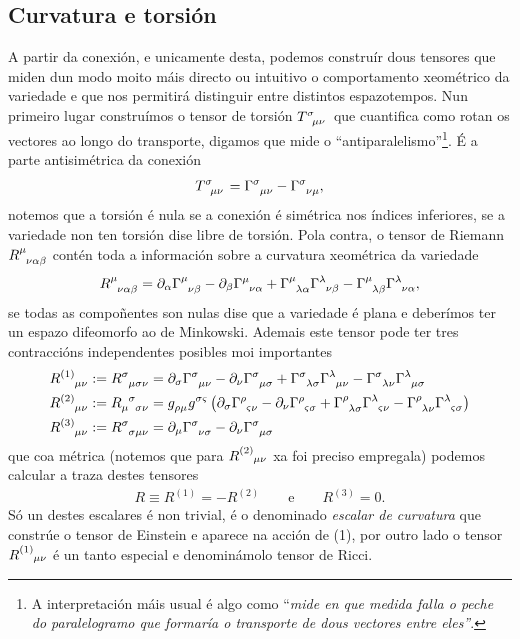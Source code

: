 \subsection{Curvatura e torsión}
A partir da conexión, e unicamente desta, podemos construír dous tensores que miden dun modo moito máis directo ou intuitivo o comportamento xeométrico da variedade e que nos permitirá distinguir entre distintos espazotempos. Nun primeiro lugar construímos o tensor de torsión $T\indices{^\sigma_\mu_\nu}$ que cuantifica como rotan os vectores ao longo do transporte, digamos que mide o ``antiparalelismo''\footnote{A interpretación máis usual é algo como ``\textit{mide en que medida falla o peche do paralelogramo que formaría o transporte de dous vectores entre eles''}.}. É a parte antisimétrica da conexión
\begin{align}
    T\indices{^\sigma_\mu_\nu} = \Gamma\indices{^\sigma_\mu_\nu} - \Gamma\indices{^\sigma_\nu_\mu},
\end{align}
notemos que a torsión é nula se a conexión é simétrica nos índices inferiores, se a variedade non ten torsión dise libre de torsión.
Pola contra, o tensor de Riemann $R\indices{^\mu_\nu_\alpha_\beta}$ contén toda a información sobre a curvatura xeométrica da variedade
\begin{align}
    R\indices{^\mu_\nu_\alpha_\beta} = \riemann ,
\end{align}
se todas as compoñentes son nulas dise que a variedade é plana e deberímos ter un espazo difeomorfo ao de Minkowski. Ademais este tensor pode ter tres contraccións independentes posibles moi importantes
\begin{align}
    R\indices{^{(1)}_\mu_\nu}&:= R\indices{^\sigma_\mu_\sigma_\nu} = \partial_\sigma \Gamma\indices{^\sigma_\mu_\nu} - \partial_\nu \Gamma\indices{^\sigma_\mu_\sigma} + \Gamma\indices{^\sigma_\lambda_\sigma}\Gamma\indices{^\lambda_\mu_\nu} - \Gamma\indices{^\sigma_\lambda_\nu}\Gamma\indices{^\lambda_\mu_\sigma}\\
    R\indices{^{(2)}_\mu_\nu}&:= R\indices{_\mu^\sigma_\sigma_\nu} = g\indices{_\rho_\mu}g\indices{^\sigma^\varsigma}\left( \partial_\sigma \Gamma\indices{^\rho_\varsigma_\nu} - \partial_\nu \Gamma\indices{^\rho_\varsigma_\sigma} + \Gamma\indices{^\rho_\lambda_\sigma}\Gamma\indices{^\lambda_\varsigma_\nu} - \Gamma\indices{^\rho_\lambda_\nu}\Gamma\indices{^\lambda_\varsigma_\sigma} \right)\\
    R\indices{^{(3)}_\mu_\nu}&:= R\indices{^\sigma_\sigma_\mu_\nu} = \partial_\mu \Gamma\indices{^\sigma_\nu_\sigma} - \partial_\nu \Gamma\indices{^\sigma_\mu_\sigma} 
\end{align}
que coa métrica (notemos que para $R\indices{^{(2)}_\mu_\nu}$ xa foi preciso empregala) podemos calcular a traza destes tensores
\begin{align}
    R\equiv R^{(1)} = -R^{(2)}\hspace{2em} \text{e} \hspace{2em} R^{(3)} = 0.
\end{align}
Só un destes escalares é non trivial, é o denominado \textit{escalar de curvatura} que constrúe o tensor de Einstein e aparece na acción de (1), por outro lado o tensor $R\indices{^{(1)}_\mu_\nu}$ é un tanto especial e denominámolo tensor de Ricci.

